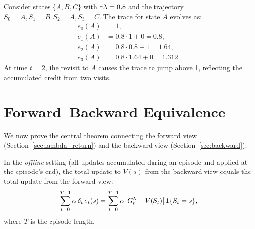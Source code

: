 \documentclass[11pt,a4paper]{article}
\begin{document}
\begin{example}
\label{ex:trace}
Consider states $\{A, B, C\}$ with $\gamma\lambda = 0.8$ and the
trajectory $S_0 = A, S_1 = B, S_2 = A, S_3 = C$. The trace for
state $A$ evolves as:
\begin{align*}
  e_0(A) &= 1, \\
  e_1(A) &= 0.8 \cdot 1 + 0 = 0.8, \\
  e_2(A) &= 0.8 \cdot 0.8 + 1 = 1.64, \\
  e_3(A) &= 0.8 \cdot 1.64 + 0 = 1.312.
\end{align*}
At time $t = 2$, the revisit to $A$ causes the trace to jump above 1,
reflecting the accumulated credit from two visits.
\end{example}

\section{Forward--Backward Equivalence}
\label{sec:equivalence}

We now prove the central theorem connecting the forward view
(Section~\ref{sec:lambda_return}) and the backward view
(Section~\ref{sec:backward}).

\begin{keyresult}[title={Forward--Backward Equivalence}]
\begin{theorem}
\label{thm:fb_equiv}
In the \emph{offline} setting (all updates accumulated during an episode
and applied at the episode's end), the total update to $V(s)$ from the
backward view equals the total update from the forward view:
\begin{equation}
  \sum_{t=0}^{T-1} \alpha\,\delta_t\,e_t(s)
  = \sum_{t=0}^{T-1} \alpha\bigl[G_t^\lambda - V(S_t)\bigr]
    \mathbf{1}\{S_t = s\},
  \label{eq:fb_equiv}
\end{equation}
where $T$ is the episode length.
\end{theorem}
\end{keyresult}
\end{document}
